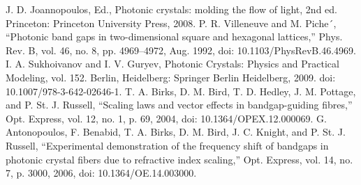 \begin{thebibliography}{hcpcf}
	 J. D. Joannopoulos, Ed., Photonic crystals: molding the flow of light, 2nd ed. Princeton: Princeton University Press, 2008.
	 P. R. Villeneuve and M. Piche´, “Photonic band gaps in two-dimensional square and hexagonal lattices,” Phys. Rev. B, vol. 46, no. 8, pp. 4969–4972, Aug. 1992, doi: 10.1103/PhysRevB.46.4969.
	 I. A. Sukhoivanov and I. V. Guryev, Photonic Crystals: Physics and Practical Modeling, vol. 152. Berlin, Heidelberg: Springer Berlin Heidelberg, 2009. doi: 10.1007/978-3-642-02646-1.
	 T. A. Birks, D. M. Bird, T. D. Hedley, J. M. Pottage, and P. St. J. Russell, “Scaling laws and vector effects in bandgap-guiding fibres,” Opt. Express, vol. 12, no. 1, p. 69, 2004, doi: 10.1364/OPEX.12.000069.
	 G. Antonopoulos, F. Benabid, T. A. Birks, D. M. Bird, J. C. Knight, and P. St. J. Russell, “Experimental demonstration of the frequency shift of bandgaps in photonic crystal fibers due to refractive index scaling,” Opt. Express, vol. 14, no. 7, p. 3000, 2006, doi: 10.1364/OE.14.003000.
\end{thebibliography}



